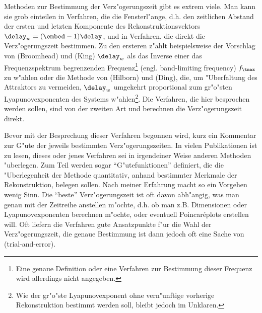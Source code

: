 Methoden zur Bestimmung der Verz"ogerungszeit gibt es extrem viele.  Man kann sie grob
einteilen in Verfahren, die die Fensterl"ange, d.h. den zeitlichen Abstand der ersten und
letzten Komponente des Rekonstruktionsvektors $\delay_w=(\embed-1)\delay$, und in
Verfahren, die direkt die Verz"ogerungszeit bestimmen.  Zu den ersteren z"ahlt
beispielsweise der Vorschlag von \autor(Broomhead) und \autor(King) $\delay_w$ als das
Inverse einer das Frequenzspektrum begrenzenden Frequenz\footnote{Eine genaue Definition
  oder eine Verfahren zur Bestimmung dieser Frequenz wird allerdings nicht angegeben.}
(engl. band-limiting frequency) $f_\tmax$ zu w"ahlen \cite{Broomhead-king} oder die
Methode von \autor(Hilborn) und \autor(Ding), die, um "Uberfaltung des Attraktors zu
vermeiden, $\delay_w$ umgekehrt proportional zum gr"o"sten Lyapunovexponenten des Systems
w"ahlen\footnote{Wie der gr"o"ste Lyapunovexponent ohne vern"unftige vorherige
  Rekonstruktion bestimmt werden soll, bleibt jedoch im Unklaren.}. Die Verfahren, die hier
besprochen werden sollen, sind von der zweiten Art und berechnen die Verz"ogerungszeit
direkt.

Bevor mit der Besprechung dieser Verfahren begonnen wird, kurz ein Kommentar zur G"ute der
jeweils bestimmten Verz"ogerungszeiten. In vielen Publikationen ist zu lesen, dieses oder
jenes Verfahren sei in irgendeiner Weise anderen Methoden "uberlegen. Zum Teil werden
sogar ``G"utefunktionen'' definiert, die die "Uberlegenheit der Methode quantitativ,
anhand bestimmter Merkmale der Rekonstruktion, belegen sollen. Nach meiner Erfahrung macht
so ein Vorgehen wenig Sinn. Die ``beste'' Verz"ogerungszeit ist oft davon abh"angig, was
man genau mit der Zeitreihe anstellen m"ochte, d.h. ob man z.B.  Dimensionen oder
Lyapunovexponenten berechnen m"ochte, oder eventuell Poincar\'eplots erstellen will. Oft
liefern die Verfahren gute Ansatzpunkte f"ur die Wahl der Verz"ogerungszeit, die genaue
Bestimmung ist dann jedoch oft eine Sache von \begriff(trial-and-error).
  

